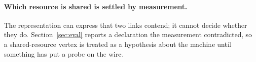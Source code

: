 \paragraph{Which resource is shared is settled by measurement.}
The representation can express that two links contend; it cannot decide
whether they do. Section~\ref{sec:eval} reports a declaration the measurement
contradicted, so a shared-resource vertex is treated as a hypothesis about the
machine until something has put a probe on the wire.
